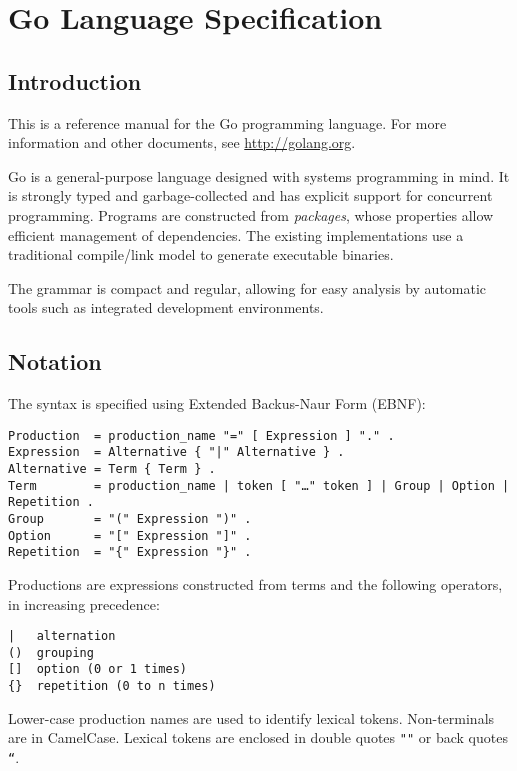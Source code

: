 \cleardoublepage
{}
{}
\appendix
\chapter*{Go Language Specification}

\section*{Introduction}

This is a reference manual for the Go programming language. For more
information and other documents, see
\href{http://golang.org/}{http://golang.org}.

Go is a general-purpose language designed with systems programming in
mind. It is strongly typed and garbage-collected and has explicit
support for concurrent programming. Programs are constructed from
\emph{packages}, whose properties allow efficient management of
dependencies. The existing implementations use a traditional
compile/link model to generate executable binaries.

The grammar is compact and regular, allowing for easy analysis by
automatic tools such as integrated development environments.

\section*{Notation}

The syntax is specified using Extended Backus-Naur Form (EBNF):

\begin{Verbatim}[frame=single]
Production  = production_name "=" [ Expression ] "." .
Expression  = Alternative { "|" Alternative } .
Alternative = Term { Term } .
Term        = production_name | token [ "…" token ] | Group | Option | Repetition .
Group       = "(" Expression ")" .
Option      = "[" Expression "]" .
Repetition  = "{" Expression "}" .
\end{Verbatim}

Productions are expressions constructed from terms and the following
operators, in increasing precedence:

\begin{Verbatim}[frame=single]
|   alternation
()  grouping
[]  option (0 or 1 times)
{}  repetition (0 to n times)
\end{Verbatim}

Lower-case production names are used to identify lexical tokens.
Non-terminals are in CamelCase. Lexical tokens are enclosed in double
quotes \texttt{""} or back quotes \texttt{``}.

